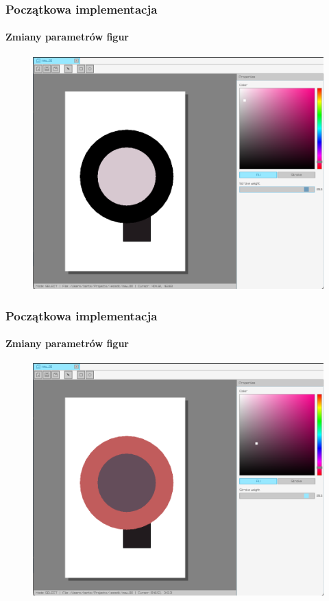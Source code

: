 \documentclass[
	11pt,]{beamer}
\begin{document}
\begin{frame}
	\frametitle{Początkowa implementacja}
	\framesubtitle{Zmiany parametrów figur}
	
	\begin{figure}
		\includegraphics[height=0.7\textheight]{figures/pro8.png}
	\end{figure}
\end{frame}

\begin{frame}
	\frametitle{Początkowa implementacja}
	\framesubtitle{Zmiany parametrów figur}
	
	\begin{figure}
		\includegraphics[height=0.7\textheight]{figures/pro9.png}
	\end{figure}
\end{frame}
\end{document}
